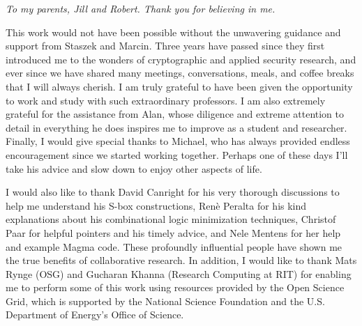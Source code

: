 \documentclass[11pt,american]{report}
\begin{document}
\beforepreface%

\vfill
\begin{center}
\indent \emph{To my parents, Jill and Robert. Thank you for believing in me.} 
\end{center}
\vfill

%
\vfill
\indent This work would not have been possible without the unwavering guidance and support from Staszek and Marcin. Three years have passed since they first introduced me to the wonders of cryptographic and applied security research, and ever since we have shared many meetings, conversations, meals, and coffee breaks that I will always cherish. I am truly grateful to have been given the opportunity to work and study with such extraordinary professors. I am also extremely grateful for the assistance from Alan, whose diligence and extreme attention to detail in everything he does inspires me to improve as a student and researcher. Finally, I would give special thanks to Michael, who has always provided endless encouragement since we started working together. Perhaps one of these days I'll take his advice and slow down to enjoy other aspects of life. 

I would also like to thank David Canright for his very thorough discussions to help me understand his S-box constructions, Ren\`{e} Peralta for his kind explanations about his combinational logic minimization techniques, Christof Paar for helpful pointers and his timely advice, and Nele Mentens for her help and example Magma code. These profoundly influential people have shown me the true benefits of collaborative research. In addition, I would like to thank Mats Rynge (OSG) and Gucharan Khanna (Research Computing at RIT) for enabling me to perform some of this work using resources provided by the Open Science Grid, which is supported by the National Science Foundation and the U.S. Department of Energy's Office of Science. 
\end{document}
